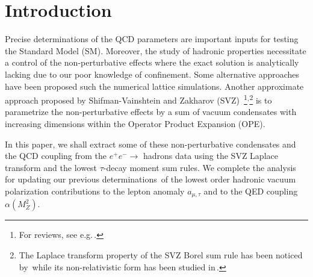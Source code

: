 \documentclass[review]{elsarticle}
\def\nin{\noindent}
\begin{document}
\begin{frontmatter}
\begin{abstract}
\begin{keyword}  QCD spectral sum rules, QCD parameters,  Hadron masses and couplings, $\tau$-decay, g-2.


\end{keyword}
\end{abstract}
\end{frontmatter}
\newpage
\section{Introduction}
\vspace*{-0.2cm}
Precise determinations of the QCD parameters are important inputs for testing the Standard Model (SM). Moreover, 
the study of hadronic properties necessitate a control of the non-perturbative effects where the exact solution is analytically lacking due to our poor knowledge of confinement. Some alternative approaches have been proposed such the numerical lattice simulations. Another approximate approach proposed by Shifman-Vainshtein and Zakharov (SVZ)\,\,\cite{SVZa}\,\footnote{For reviews, see e.g.\,\cite{ZAKA,SNB1,SNB2,SNREV1,SNREV2,SNB3,RRY,DERAF,BERTa,YNDB,PASC,DOSCH,COL}.}$^,$\footnote{The Laplace transform property of the SVZ Borel sum rule has been noticed by\,\cite{SNR} while its non-relativistic form has been studied in\,\cite{BELLa}. }  is to parametrize the non-perturbative effects by a sum of vacuum condensates with increasing dimensions within the Operator Product Expansion (OPE). 

In this paper, we shall extract some of these non-perturbative condensates and the QCD coupling from the $e^+e^-\to$ hadrons data using the SVZ Laplace transform and the lowest $\tau$-decay moment sum rules.  We complete the analysis for updating our previous determinations\,\cite{CALMET,SN76,SN78,SNamu,SNalfa} of the lowest order hadronic vacuum polarization  contributions to the lepton anomaly  $a_{\mu,\tau}$ and to the QED coupling $\alpha(M_Z^2)$.

\end{document}
